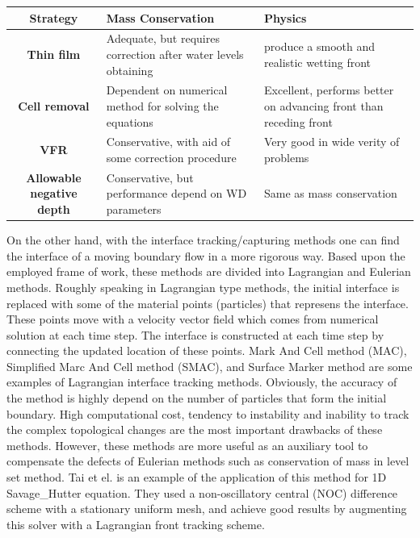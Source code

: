 \documentclass[letterpaper,10pt]{article}
\begin{document}
\begin{center}\label{table1}
\begin{tabular}{|c|p{5cm}|p{5cm}|}
 
\hline
{\bf Strategy}                  & {\bf Mass Conservation}                                          & {\bf Physics} \\
\hline
{\bf Thin film}                 & Adequate, but requires correction after water levels obtaining   & produce a smooth and realistic wetting front      \\
\hline 
{\bf Cell removal}              & Dependent on numerical method for solving the equations          & Excellent, performs better on advancing front than receding front \\
\hline
{\bf VFR}                       & Conservative, with aid of some correction procedure              & Very good in wide verity of problems      \\
\hline
{\bf Allowable negative depth}  & Conservative, but performance depend on WD parameters            & Same as mass conservation      \\
\hline
\end{tabular}
\end{center}

On the other hand, with the interface tracking/capturing methods one can find the interface
of a moving boundary flow in a more rigorous way.
Based upon the employed frame of work, these methods are divided into Lagrangian and Eulerian methods.
Roughly speaking in Lagrangian type methods, the initial interface is replaced with some of the material 
points (particles) that represens the interface. These points move with a velocity vector field which comes 
from numerical solution at each time step. The interface is constructed at each time step by connecting 
the updated location of these points. 
Mark And Cell method (MAC)\cite{}, Simplified Marc And Cell method (SMAC),
and Surface Marker method are some examples of Lagrangian interface tracking methods.
Obviously, the accuracy of the method is highly depend on the number 
of particles that form the initial boundary. 
High computational cost, tendency to instability and inability to track the complex topological changes are the most 
important drawbacks of these methods. 
However, these methods are more useful as an auxiliary tool to compensate the defects of Eulerian methods 
such as conservation of mass in level set method. Tai et el. \cite{Tai2002} is an example of the application of 
this method for 1D Savage\_Hutter equation. They used a non-oscillatory central (NOC) difference scheme with a 
stationary uniform mesh, and achieve good results by augmenting this solver with a Lagrangian front tracking scheme.\newline
\end{document}
